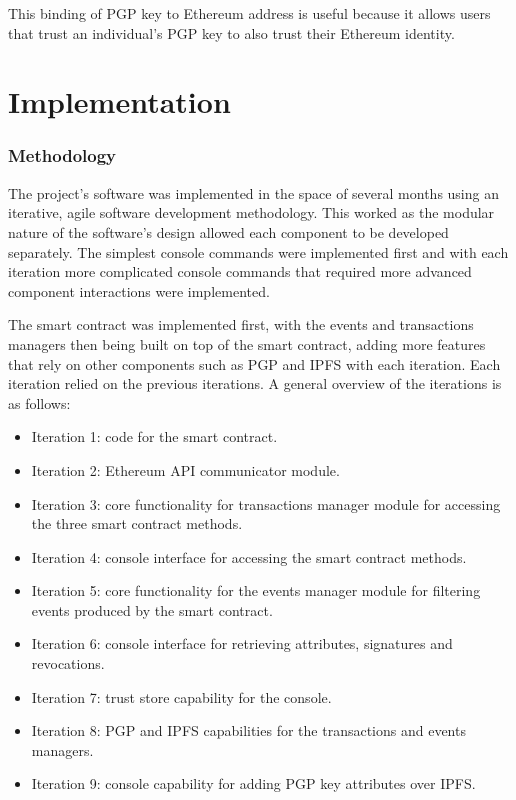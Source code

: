 \documentclass[12pt,a4paper]{report}
\begin{document}
	This binding of PGP key to Ethereum address is useful because it allows users that trust an individual's PGP key to also trust their Ethereum identity.
	
	\chapter{Implementation}
	
	\subsection{Methodology}
	The project's software was implemented in the space of several months using an iterative, agile software development methodology. This worked as the modular nature of the software's design allowed each component to be developed separately. The simplest console commands were implemented first and with each iteration more complicated console commands that required more advanced component interactions were implemented.
	
	The smart contract was implemented first, with the events and transactions managers then being built on top of the smart contract, adding more features that rely on other components such as PGP and IPFS with each iteration. Each iteration relied on the previous iterations. A general overview of the iterations is as follows:
	\begin{itemize}
		\item Iteration 1: code for the smart contract.
		\item Iteration 2: Ethereum API communicator module.
		\item Iteration 3: core functionality for transactions manager module for accessing the three smart contract methods.
		\item Iteration 4: console interface for accessing the smart contract methods.
		\item Iteration 5: core functionality for the events manager module for filtering events produced by the smart contract.
		\item Iteration 6: console interface for retrieving attributes, signatures and revocations.
		\item Iteration 7: trust store capability for the console.
		\item Iteration 8: PGP and IPFS capabilities for the transactions and events managers.
		\item Iteration 9: console capability for adding PGP key attributes over IPFS.
	\end{itemize}
	
\end{document}
